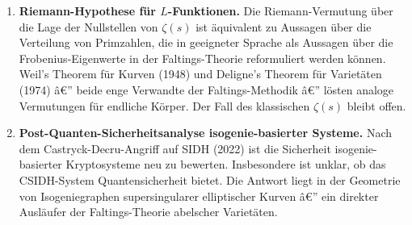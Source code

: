 ﻿\documentclass[12pt,a4paper]{article}
\theoremstyle{plain}
\theoremstyle{definition}
\theoremstyle{remark}
\begin{document}
\begin{enumerate}[leftmargin=2em,itemsep=6pt, label=\textbf{(\arabic*)}]
  \item \textbf{Riemann-Hypothese für $L$-Funktionen.}
    Die Riemann-Vermutung über die Lage der Nullstellen von $\zeta(s)$
    ist äquivalent zu Aussagen über die Verteilung von Primzahlen,
    die in geeigneter Sprache als Aussagen über die Frobenius-Eigenwerte
    in der Faltings-Theorie reformuliert werden können.
    Weil's Theorem für Kurven (1948) und Deligne's Theorem für Varietäten (1974)
    â€” beide enge Verwandte der Faltings-Methodik â€” lösten analoge Vermutungen
    für endliche Körper. Der Fall des klassischen $\zeta(s)$ bleibt offen.

  \item \textbf{Post-Quanten-Sicherheitsanalyse isogenie-basierter Systeme.}
    Nach dem Cast\-ryck-Decru-Angriff auf SIDH (2022) ist die Sicherheit
    isogenie-basierter Kryptosysteme neu zu bewerten. Insbesondere ist unklar,
    ob das CSIDH-System Quantensicherheit bietet. Die Antwort liegt in der
    Geometrie von Isogeniegraphen supersingularer elliptischer Kurven â€”
    ein direkter Ausläufer der Faltings-Theorie abelscher Varietäten.
\end{enumerate}
\end{document}
